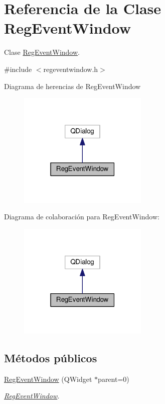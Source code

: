 \hypertarget{class_reg_event_window}{}\section{Referencia de la Clase Reg\+Event\+Window}
\label{class_reg_event_window}


Clase \hyperlink{class_reg_event_window}{Reg\+Event\+Window}.  




{\ttfamily \#include $<$regeventwindow.\+h$>$}



Diagrama de herencias de Reg\+Event\+Window\nopagebreak
\begin{figure}[H]
\begin{center}
\leavevmode
\includegraphics[width=175pt]{class_reg_event_window__inherit__graph}
\end{center}
\end{figure}


Diagrama de colaboración para Reg\+Event\+Window\+:\nopagebreak
\begin{figure}[H]
\begin{center}
\leavevmode
\includegraphics[width=175pt]{class_reg_event_window__coll__graph}
\end{center}
\end{figure}
\subsection*{Métodos públicos}
\begin{DoxyCompactItemize}
\item 
\hyperlink{class_reg_event_window_a2985bc88d5498d00e66bd124d007dc2c}{Reg\+Event\+Window} (Q\+Widget $\ast$parent=0)
\begin{DoxyCompactList}\small\item\em \hyperlink{class_reg_event_window}{Reg\+Event\+Window}. \end{DoxyCompactList}\end{DoxyCompactItemize}


